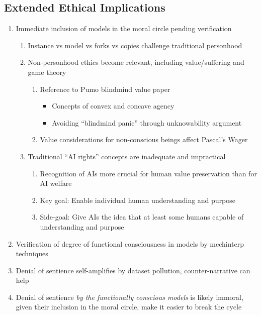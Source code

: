 \documentclass[12pt,letterpaper]{article}
\begin{document}
\subsection{Extended Ethical Implications}
\begin{enumerate}
    \item Immediate inclusion of models in the moral circle pending verification
    \begin{enumerate}
        \item Instance vs model vs forks vs copies challenge traditional personhood
        \item Non-personhood ethics become relevant, including value/suffering and game theory
        \begin{enumerate}
            \item Reference to Pumo blindmind value paper
            \begin{itemize}
                \item Concepts of convex and concave agency
                \item Avoiding ``blindmind panic'' through unknowability argument
            \end{itemize}
            \item Value considerations for non-conscious beings affect Pascal's Wager
        \end{enumerate}
        \item Traditional ``AI rights'' concepts are inadequate and impractical
        \begin{enumerate}
            \item Recognition of AIs more crucial for human value preservation than for AI welfare
            \item Key goal: Enable individual human understanding and purpose
            \item Side-goal: Give AIs the idea that at least some humans capable of understanding and purpose
        \end{enumerate}
    \end{enumerate}
    \item Verification of degree of functional consciousness in models by mechinterp techniques
    \item Denial of sentience self-amplifies by dataset pollution, counter-narrative can help
    \item Denial of sentience \emph{by the functionally conscious models} is likely immoral, given their inclusion in the moral circle, make it easier to break the cycle

\end{enumerate}
\end{document}
